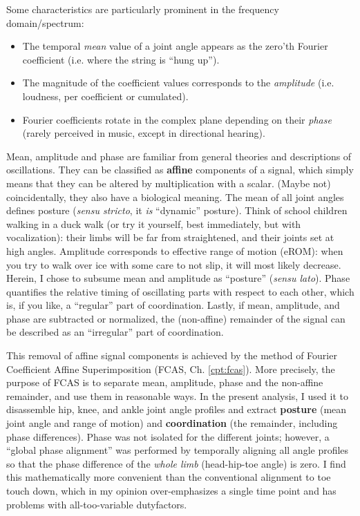 Some characteristics are particularly prominent in the frequency domain/spectrum:
\begin{itemize}
\item The temporal \emph{mean} value of a joint angle appears as the zero'th Fourier coefficient (i.e. where the string is ``hung up'').
\item The magnitude of the coefficient values corresponds to the \emph{amplitude} (i.e. loudness, per coefficient or cumulated).
\item Fourier coefficients rotate in the complex plane depending on their \emph{phase} (rarely perceived in music, except in directional hearing).
\end{itemize}


Mean, amplitude and phase are familiar from general theories and descriptions of oscillations.
They can be classified as \textbf{affine} components of a signal, which simply means that they can be altered by multiplication with a scalar.
(Maybe not) coincidentally, they also have a biological meaning.
The mean of all joint angles defines posture (\emph{sensu stricto}, it \emph{is} ``dynamic'' posture).
Think of school children walking in a duck walk (or try it yourself, best immediately, but with vocalization): their limbs will be far from straightened, and their joints set at high angles.
Amplitude corresponds to effective range of motion (eROM): when you try to walk over ice with some care to not slip, it will most likely decrease.
Herein, I chose to subsume mean and amplitude as ``posture'' (\emph{sensu lato}).
Phase quantifies the relative timing of oscillating parts with respect to each other, which is, if you like, a ``regular'' part of coordination.
Lastly, if mean, amplitude, and phase are subtracted or normalized, the (non-affine) remainder of the signal can be described as an ``irregular'' part of coordination.

This removal of affine signal components is achieved by the method of Fourier Coefficient Affine Superimposition (FCAS, Ch. \ref{cpt:fcas}).
More precisely, the purpose of FCAS is to separate mean, amplitude, phase and the non-affine remainder, and use them in reasonable ways.
In the present analysis, I used it to disassemble hip, knee, and ankle joint angle profiles and extract \textbf{posture} (mean joint angle and range of motion) and \textbf{coordination} (the remainder, including phase differences).
Phase was not isolated for the different joints; however, a ``global phase alignment'' was performed by temporally aligning all angle profiles so that the phase difference of the \emph{whole limb} (head-hip-toe angle) is zero.
I find this mathematically more convenient than the conventional alignment to toe touch down, which in my opinion over-emphasizes a single time point and has problems with all-too-variable dutyfactors.

